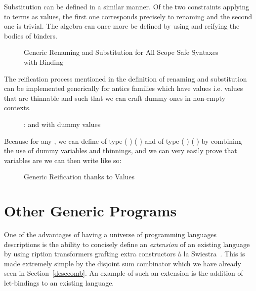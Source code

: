 Substitution can be defined in a similar manner. Of the two
constraints applying to terms as values, the first one corresponds
precisely to renaming and the second one is trivial. The algebra
can once more be defined by using  and reifying the bodies
of binders.

\begin{figure}[h]
\begin{minipage}{0.45\textwidth}
\end{minipage}\hspace{2em}
\begin{minipage}{0.45\textwidth}
\end{minipage}
\caption{Generic Renaming and Substitution for All Scope Safe Syntaxes with Binding}
\end{figure}

The reification process mentioned in the definition of renaming
and substitution can be implemented generically for antics
families which have  values i.e. values that are thinnable
and such that we can craft dummy ones in non-empty contexts.

\begin{figure}[h]
\caption{:  and with dummy values}
\end{figure}

Because for any  , we can define  of
type {( )  ( \AF{++} )} and  of
type {( )  ( \AF{++} )} by combining the use
of dummy variables and thinnings, and we can very easily prove that variables
are  we can then write  like so:

\begin{figure}[h]
\caption{Generic Reification thanks to  Values}
\end{figure}




\section{Other Generic Programs}

One of the advantages of having a universe of programming languages
descriptions is the ability to concisely define an \emph{extension}
of an existing language by using ription transformers
grafting extra constructors à la Swiestra~\citeyear{swierstra_2008}.
This is made extremely simple by the
disjoint sum combinator  which we have already seen
in Section~\ref{desccomb}.
An example of such an extension is the addition of let-bindings to
an existing language.

